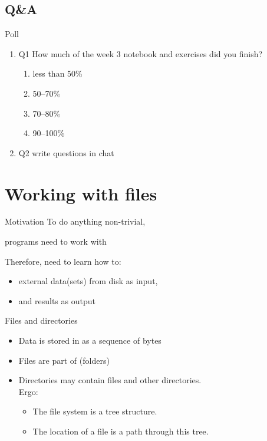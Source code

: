 \documentclass[aspectratio=169,usenames,dvipsnames]{beamer}
\begin{document}
\subsection{Q\&A}
\begin{frame}{Poll}
    \begin{enumerate}
        \item Q1 How much of the week 3 notebook and exercises did you finish?
            \begin{enumerate}
                \item less than 50\%
                \item 50--70\%
                \item 70--80\%
                \item 90--100\%
            \end{enumerate}
        \item Q2 write questions in chat
    \end{enumerate}
\end{frame}



\section{Working with files}
\frame{\tableofcontents[currentsection]}

\begin{frame}{Motivation}
    To do anything non-trivial,

    programs need to work with 

    \pause
    Therefore, need to learn how to:

	\begin{itemize}
		\item {} external data(sets) from disk as input,
		\item and  results as output
	\end{itemize}

\end{frame}


\begin{frame}{Files and directories}
    \begin{itemize}
        \item Data is stored in  as a sequence of bytes
        \item Files are part of  (folders)
        \item Directories may contain files and other directories.\\
            Ergo:
            \begin{itemize}
                \item The file system is a tree structure.
                \item The location of a file is a path through this tree.
            \end{itemize}
    \end{itemize}
\end{frame}
\end{document}
